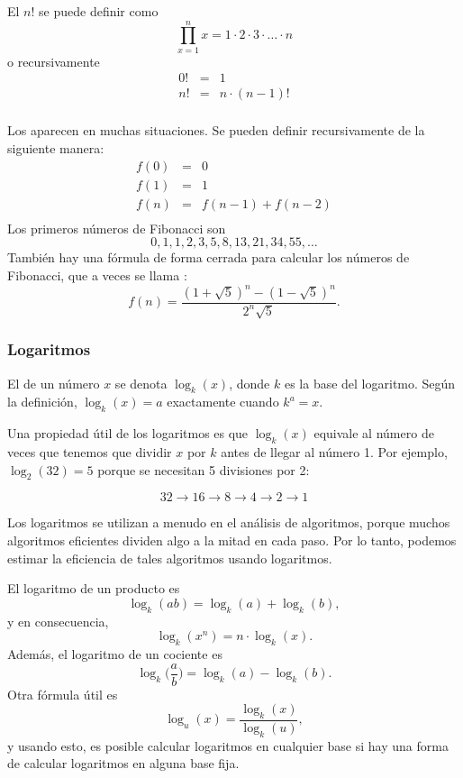 
El  $n!$ se puede definir como
\[\prod_{x=1}^n x = 1 \cdot 2 \cdot 3 \cdot \ldots \cdot n\]
o recursivamente
\[
\begin{array}{lcl}
0! & = & 1 \\
n! & = & n \cdot (n-1)! \\
\end{array}
\]


Los 
aparecen en muchas situaciones.
Se pueden definir recursivamente de la siguiente manera:
\[
\begin{array}{lcl}
f(0) & = & 0 \\
f(1) & = & 1 \\
f(n) & = & f(n-1)+f(n-2) \\
\end{array}
\]
Los primeros n\'umeros de Fibonacci son
\[0, 1, 1, 2, 3, 5, 8, 13, 21, 34, 55, \ldots\]
Tambi\'en hay una f\'ormula de forma cerrada
para calcular los n\'umeros de Fibonacci, que a veces se llama
 :
\[f(n)=\frac{(1 + \sqrt{5})^n - (1-\sqrt{5})^n}{2^n \sqrt{5}}.\]

\subsubsection{Logaritmos}


El  de un n\'umero $x$
se denota $\log_k(x)$, donde $k$ es la base
del logaritmo.
Seg\'un la definici\'on,
$\log_k(x)=a$ exactamente cuando $k^a=x$.

Una propiedad \'util de los logaritmos es
que $\log_k(x)$ equivale al n\'umero de veces
que tenemos que dividir $x$ por $k$ antes de llegar
al n\'umero 1.
Por ejemplo, $\log_2(32)=5$
porque se necesitan 5 divisiones por 2:

\[32 \rightarrow 16 \rightarrow 8 \rightarrow 4 \rightarrow 2 \rightarrow 1 \]

Los logaritmos se utilizan a menudo en el an\'alisis de
algoritmos, porque muchos algoritmos eficientes
dividen algo a la mitad en cada paso.
Por lo tanto, podemos estimar la eficiencia de tales algoritmos
usando logaritmos.

El logaritmo de un producto es
\[\log_k(ab) = \log_k(a)+\log_k(b),\]
y en consecuencia,
\[\log_k(x^n) = n \cdot \log_k(x).\]
Adem\'as, el logaritmo de un cociente es
\[\log_k\Big(\frac{a}{b}\Big) = \log_k(a)-\log_k(b).\]
Otra f\'ormula \'util es
\[\log_u(x) = \frac{\log_k(x)}{\log_k(u)},\]
y usando esto, es posible calcular
logaritmos en cualquier base si hay una forma de
calcular logaritmos en alguna base fija.

